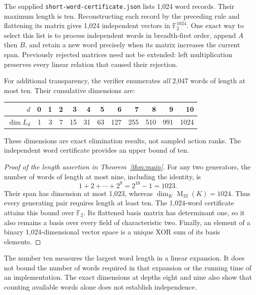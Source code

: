 \documentclass[11pt,a4paper]{article}
\theoremstyle{definition}\newtheorem{definition}[theorem]{Definition}
\newcommand{\F}{\mathbb F_2}
\newcommand{\Mat}{\operatorname{M}}
\begin{document}
The supplied \texttt{short-word-certificate.json} lists 1,024 word records.
Their maximum length is ten. Reconstructing each record by the preceding
rule and flattening its matrix gives 1,024 independent vectors in
$\F^{1024}$. One exact way to select this list is to process independent
words in breadth-first order, append $A$ then $B$, and retain a new word
precisely when its matrix increases the current span. Previously rejected
matrices need not be extended: left multiplication preserves every linear
relation that caused their rejection.

For additional transparency, the verifier enumerates \emph{all} 2,047
words of length at most ten. Their cumulative dimensions are:
\begin{center}
\small
\begin{tabular}{@{}rrrrrrrrrrrr@{}}
\toprule
$d$&0&1&2&3&4&5&6&7&8&9&10\\
\midrule
$\dim L_d$&1&3&7&15&31&63&127&255&510&991&1024\\
\bottomrule
\end{tabular}
\end{center}
These dimensions are exact elimination results, not sampled action ranks.
The independent word certificate provides an upper bound of ten.

\begin{proof}[Proof of the length assertion in Theorem~\ref{thm:main}]
For any two generators, the number of words of length at most nine,
including the identity, is
\[
 1+2+\cdots+2^9=2^{10}-1=1023.
\]
Their span has dimension at most 1,023, whereas
$\dim_K\Mat_{32}(K)=1024$. Thus every generating pair requires length
at least ten. The 1,024-word certificate attains this bound over $\F$.
Its flattened basis matrix has determinant one, so it also remains a basis
over every field of characteristic two. Finally, an element of a binary
1,024-dimensional vector space is a unique XOR sum of its basis elements.
\end{proof}

The number ten measures the largest word length in a linear expansion.
It does not bound the number of words required in that expansion or the
running time of an implementation. The exact dimensions at depths eight
and nine also show that counting available words alone does not establish
independence.
\end{document}
